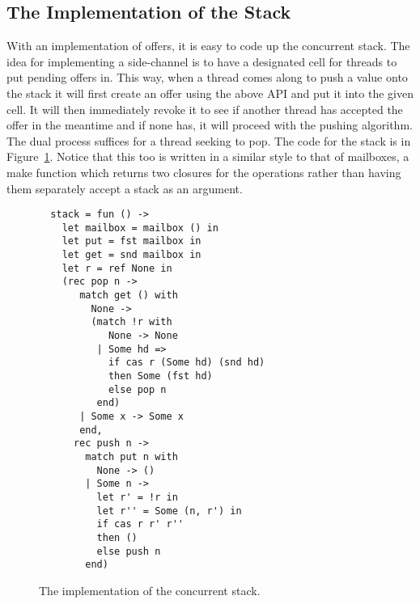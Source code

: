 \subsection{The Implementation of the Stack}
With an implementation of offers, it is easy to code up the concurrent
stack. The idea for implementing a side-channel is to have a
designated cell for threads to put pending offers in. This way, when a
thread comes along to push a value onto the stack it will first create
an offer using the above API and put it into the given cell. It will
then immediately revoke it to see if another thread has accepted the
offer in the meantime and if none has, it will proceed with the
pushing algorithm. The dual process suffices for a thread seeking to
pop. The code for the stack is in Figure~\ref{fig:code:stack}. Notice
that this too is written in a similar style to that of mailboxes, a
make function which returns two closures for the operations rather
than having them separately accept a stack as an argument.
\begin{figure}
\begin{lstlisting}
  stack = fun () ->
    let mailbox = mailbox () in
    let put = fst mailbox in
    let get = snd mailbox in
    let r = ref None in
    (rec pop n ->
       match get () with
         None ->
         (match !r with
            None -> None
          | Some hd =>
            if cas r (Some hd) (snd hd)
            then Some (fst hd)
            else pop n
          end)
       | Some x -> Some x
       end,
      rec push n ->
        match put n with
          None -> ()
        | Some n ->
          let r' = !r in
          let r'' = Some (n, r') in
          if cas r r' r''
          then ()
          else push n
        end)
\end{lstlisting}
\caption{The implementation of the concurrent stack.}
\label{fig:code:stack}
\end{figure}

